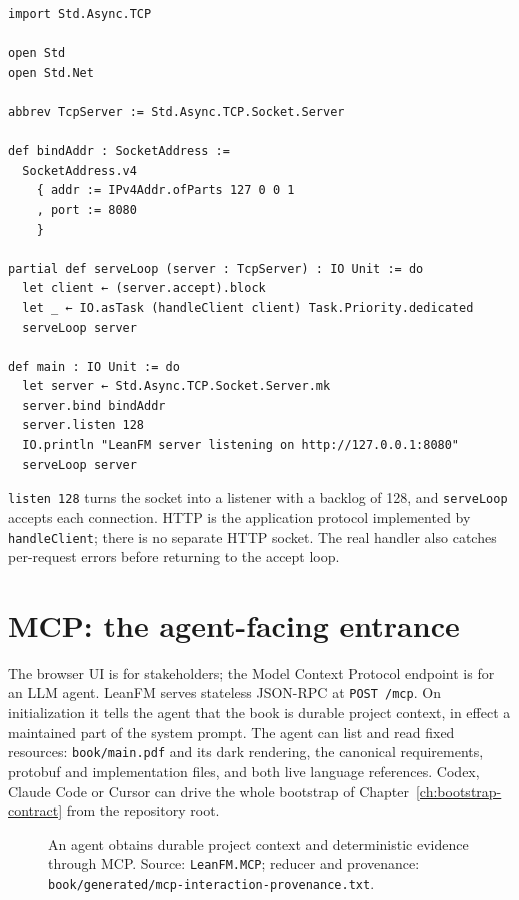 \begin{lstlisting}[language=Lean]
import Std.Async.TCP

open Std
open Std.Net

abbrev TcpServer := Std.Async.TCP.Socket.Server

def bindAddr : SocketAddress :=
  SocketAddress.v4
    { addr := IPv4Addr.ofParts 127 0 0 1
    , port := 8080
    }

partial def serveLoop (server : TcpServer) : IO Unit := do
  let client ← (server.accept).block
  let _ ← IO.asTask (handleClient client) Task.Priority.dedicated
  serveLoop server

def main : IO Unit := do
  let server ← Std.Async.TCP.Socket.Server.mk
  server.bind bindAddr
  server.listen 128
  IO.println "LeanFM server listening on http://127.0.0.1:8080"
  serveLoop server
\end{lstlisting}

\texttt{listen 128} turns the socket into a listener with a backlog of 128, and
\texttt{serveLoop} accepts each connection. HTTP is the application protocol
implemented by \texttt{handleClient}; there is no separate HTTP socket. The real
handler also catches per-request errors before returning to the accept loop.

\section{MCP: the agent-facing entrance}

The browser UI is for stakeholders; the Model Context Protocol endpoint is for an
LLM agent. LeanFM serves stateless JSON-RPC at \texttt{POST /mcp}. On
initialization it tells the agent that the book is durable project context, in
effect a maintained part of the system prompt. The agent can list and read fixed
resources: \texttt{book/main.pdf} and its dark rendering, the canonical
requirements, protobuf and implementation files, and both live language
references. Codex, Claude Code or Cursor can drive the whole bootstrap of
Chapter~\ref{ch:bootstrap-contract} from the repository root.

\begin{figure}[htbp]
\centering
\resizebox{\textwidth}{!}{}
\caption{An agent obtains durable project context and deterministic evidence
through MCP. Source: \texttt{LeanFM.MCP}; reducer and provenance:
\texttt{book/generated/mcp-interaction-provenance.txt}.}
\label{fig:mcp-interaction}
\end{figure}

